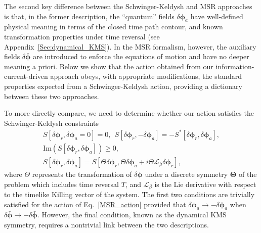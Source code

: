 \documentclass[aps,prd,nofootinbib,amsmath,amssymb,showpacs,longbibliography,singlecolumn,superscriptaddress,notitlepage]{revtex4-1}
\theoremstyle{plain}
\theoremstyle{definition}
\newcommand{\cvec}[1]{\ensuremath{\bm {#1}}}
\begin{document}
The second key difference between the Schwinger-Keldysh and MSR approaches is that, in the former description, the ``quantum'' fields $\delta\cvec{\phi}_a$ have well-defined physical meaning in terms of the closed time path contour, and known transformation properties under time reversal (see Appendix~\ref{Sec:dynamical_KMS}).  
In the MSR formalism, however, the auxiliary fields $\delta\bar{\cvec{\phi}}$ are introduced to enforce the equations of motion and have no deeper meaning a priori. Below we show that the action obtained from our information-current-driven approach obeys, with appropriate modifications, the standard properties expected from a Schwinger-Keldysh action, providing a dictionary between these two approaches.
 
To more directly compare, we need to determine whether our action satisfies the Schwinger-Keldysh constraints 
\begin{eqnarray}
    S[\delta \cvec{\phi}_r, \delta \cvec{\phi}_a = 0] = 0 , \:\: S[\delta \cvec{\phi}_r, -\delta \cvec{\phi}_a] = -S^*[\delta \cvec{\phi}_r, \delta \cvec{\phi}_a] , \\
    \mathrm{Im} \left( S[\delta \cvec{\phi}_r, \delta \cvec{\phi}_a] \right) \geq 0 , \\
    S[\delta \cvec{\phi}_r, \delta \cvec{\phi}_a] = S[ \Theta \delta \cvec{\phi}_r, \Theta \delta \cvec{\phi}_a + i \Theta \mathcal{L}_{\beta} \delta \cvec{\phi}_r] ,
    \label{eq:KMS0}
\end{eqnarray}
where $\Theta$ represents the transformation of $\delta\cvec{\phi}$ under a discrete symmetry $\bm\Theta$ of the problem which includes time reversal $T$, and $\mathcal{L}_{\beta}$ is the Lie derivative with respect to the timelike Killing vector of the system. The first two conditions are trivially satisfied for the action of Eq.\ \eqref{MSR_action} provided that $\delta\cvec{\phi}_a \to - \delta\cvec{\phi}_a$ when $\delta\bar{\cvec{\phi}}\to -\delta\bar{\cvec{\phi}}$. However, the final condition, known as the dynamical KMS symmetry, requires a nontrivial link between the two descriptions. 
\end{document}

